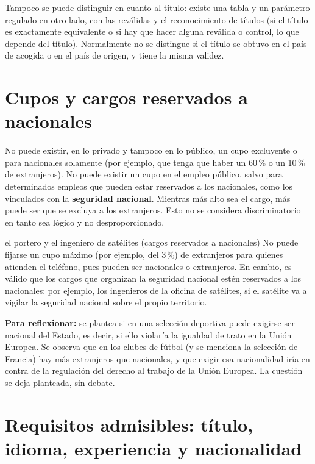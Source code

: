 \documentclass[12pt,oneside]{book}
\begin{document}
Tampoco se puede distinguir en cuanto al título: existe una tabla y un parámetro regulado en otro lado, con las reválidas y el reconocimiento de títulos (si el título es exactamente equivalente o si hay que hacer alguna reválida o control, lo que depende del título). Normalmente no se distingue si el título se obtuvo en el país de acogida o en el país de origen, y tiene la misma validez.

\section{Cupos y cargos reservados a nacionales}

No puede existir, en lo privado y tampoco en lo público, un cupo excluyente o para nacionales solamente (por ejemplo, que tenga que haber un 60\,\% o un 10\,\% de extranjeros). No puede existir un cupo en el empleo público, salvo para determinados empleos que pueden estar reservados a los nacionales, como los vinculados con la \textbf{seguridad nacional}. Mientras más alto sea el cargo, más puede ser que se excluya a los extranjeros. Esto no se considera discriminatorio en tanto sea lógico y no desproporcionado.

\begin{example}{el portero y el ingeniero de satélites (cargos reservados a nacionales)}
No puede fijarse un cupo máximo (por ejemplo, del 3\,\%) de extranjeros para quienes atienden el teléfono, pues pueden ser nacionales o extranjeros. En cambio, es válido que los cargos que organizan la seguridad nacional estén reservados a los nacionales: por ejemplo, los ingenieros de la oficina de satélites, si el satélite va a vigilar la seguridad nacional sobre el propio territorio.
\end{example}

\begin{note}
\textbf{Para reflexionar:} se plantea si en una selección deportiva puede exigirse ser nacional del Estado, es decir, si ello violaría la igualdad de trato en la Unión Europea. Se observa que en los clubes de fútbol (y se menciona la selección de Francia) hay más extranjeros que nacionales, y que exigir esa nacionalidad iría en contra de la regulación del derecho al trabajo de la Unión Europea. La cuestión se deja planteada, sin debate.
\end{note}

\section{Requisitos admisibles: título, idioma, experiencia y nacionalidad}
\end{document}
